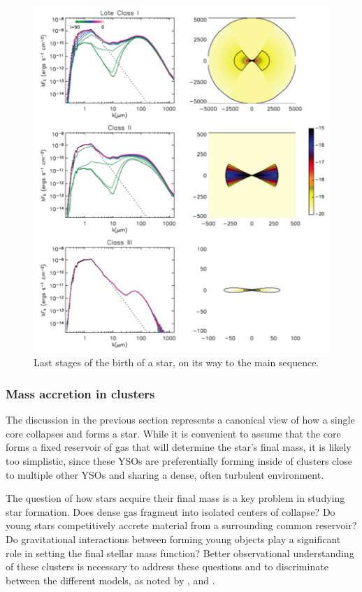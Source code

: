 \begin{figure}[!ht]
	\centering
	\includegraphics[width=\textwidth]{Figures/Whitney2.png}
	\caption[Stages I through III]{Last stages of the birth of a star, on its way to the main sequence.}
	\label{fig:whitney2}
    \end{figure}


\subsubsection{Mass accretion in clusters}


The discussion in the previous section represents a canonical view of how a single core collapses and forms a star. While it is convenient to assume that the core forms a fixed reservoir of gas that will determine the star's final mass, it is likely too simplistic, since these YSOs are preferentially forming inside of clusters close to multiple other YSOs and sharing a dense, often turbulent environment. 

The question of how stars acquire their final mass is a key problem in studying star formation. Does dense gas fragment into isolated centers of collapse? Do young stars competitively accrete material from a surrounding common reservoir? Do gravitational interactions between forming young objects play a significant role in setting the final stellar mass function? Better observational understanding of these clusters is necessary to address these questions and to discriminate between the different models, as noted by \cite{Bonnell:2006ee}, \cite{Offner:2011ex} and \cite{Myers:2011fy}.


